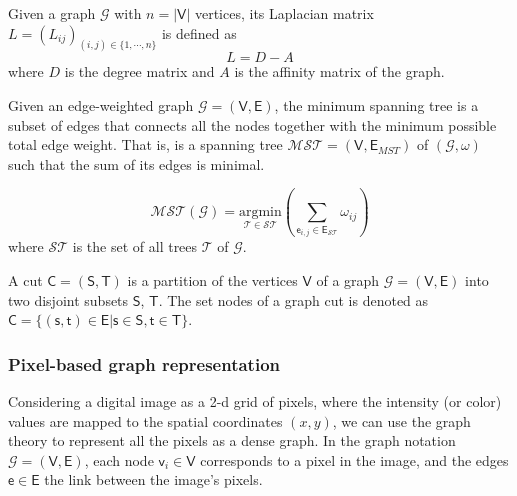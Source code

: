 \begin{definition}
	Given a graph $\mathcal{G}$ with $n=|\mathsf{V}|$ vertices, its Laplacian matrix $L = (L_{ij})_{(i, j)\in \{1,\cdots, n\}}$ is defined as 
	\begin{equation}	
		L = D - A  \nonumber 		
	\end{equation}	
where $D$ is the degree matrix and $A$ is the affinity matrix of the graph.
\end{definition}

\begin{definition}
	Given an edge-weighted graph $\mathcal{G}=(\mathsf{V}, \mathsf{E})$, the minimum spanning tree is a subset of edges that connects all the nodes together with the minimum possible total edge weight. That is, is a spanning tree $\mathcal{MST}=(\mathsf{V}, \mathsf{E}_{MST})$ of $(\mathcal{G}, \omega)$ such that
the sum of its edges is minimal.

\begin{equation}
	\mathcal{MST}(\mathcal{G}) = \underset{\mathcal{T} \in \mathcal{ST}}{\mathrm{argmin}} \left( \sum_{\mathsf{e}_{i,j} \in \mathsf{E}_\mathcal{ST}} \omega_{ij} \right) \nonumber
\end{equation}
where $\mathcal{ST}$ is the set of all trees $\mathcal{T}$ of $\mathcal{G}$.
\end{definition}

\begin{definition}
	A cut $\mathsf{C}=(\mathsf{S}, \mathsf{T})$ is a partition of the vertices $\mathsf{V}$ of a graph $\mathcal{G}=(\mathsf{V}, \mathsf{E})$ into two disjoint subsets $\mathsf{S}$, $\mathsf{T}$. The set nodes of a graph cut is denoted as $\mathsf{C}=\{ (\mathsf{s}, \mathsf{t}) \in \mathsf{E} | \mathsf{s} \in \mathsf{S}, \mathsf{t} \in \mathsf{T} \}$.
\end{definition}
%

\subsubsection{Pixel-based graph representation}

Considering a digital image as a 2-d grid of pixels, where the intensity (or color) values are mapped to the spatial coordinates $(x, y)$, we can use the graph theory to represent all the pixels as a dense graph. In the graph notation $\mathcal{G}=(\mathsf{V}, \mathsf{E})$, each node $\mathsf{v}_i \in \mathsf{V}$ corresponds to a pixel in the image, and the edges $\mathsf{e} \in \mathsf{E}$ the link between the image's pixels.

